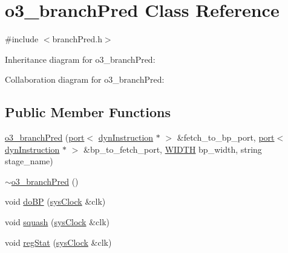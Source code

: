 \hypertarget{classo3__branchPred}{
\section{o3\_\-branchPred Class Reference}
\label{classo3__branchPred}
}


{\ttfamily \#include $<$branchPred.h$>$}



Inheritance diagram for o3\_\-branchPred:


Collaboration diagram for o3\_\-branchPred:
\subsection*{Public Member Functions}
\begin{DoxyCompactItemize}
\item 
\hyperlink{classo3__branchPred_ad491f8c1906fecc1336585bed1677079}{o3\_\-branchPred} (\hyperlink{classport}{port}$<$ \hyperlink{classdynInstruction}{dynInstruction} $\ast$ $>$ \&fetch\_\-to\_\-bp\_\-port, \hyperlink{classport}{port}$<$ \hyperlink{classdynInstruction}{dynInstruction} $\ast$ $>$ \&bp\_\-to\_\-fetch\_\-port, \hyperlink{global_2global_8h_a6fa2e24b8a418fa215e183264cbea3aa}{WIDTH} bp\_\-width, string stage\_\-name)
\item 
\hyperlink{classo3__branchPred_ab497c6edb4266e04ae0b20969caeb525}{$\sim$o3\_\-branchPred} ()
\item 
void \hyperlink{classo3__branchPred_ab70a61011f52674364f5a24f276973b3}{doBP} (\hyperlink{classsysClock}{sysClock} \&clk)
\item 
void \hyperlink{classo3__branchPred_a41218ba2c469ee35610ed5b1af5e49c0}{squash} (\hyperlink{classsysClock}{sysClock} \&clk)
\item 
void \hyperlink{classo3__branchPred_a58f7e7a2260333813a3fa672eff86796}{regStat} (\hyperlink{classsysClock}{sysClock} \&clk)
\end{DoxyCompactItemize}


